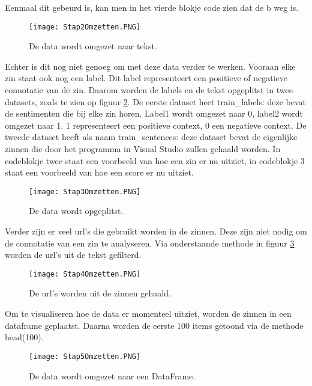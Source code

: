 Eenmaal dit gebeurd is, kan men in het vierde blokje code zien dat de b weg is.

\begin{figure}[!htbp]
    \texttt{[image: Stap2Omzetten.PNG]}
    \caption{\label{stap2amazon}De data wordt omgezet naar tekst.}
\end{figure}
\FloatBarrier

Echter is dit nog niet genoeg om met deze data verder te werken. Vooraan elke zin staat ook nog een label. Dit label representeert een positieve of negatieve connotatie van de zin. Daarom worden de labels en de tekst opgeplitst in twee datasets, zoals te zien op figuur \ref{stap3amazon}. De eerste dataset heet train\_labels: deze bevat de sentimenten die bij elke zin horen. Label1 wordt omgezet naar 0, label2 wordt omgezet naar 1. 1 representeert een positieve context, 0 een negatieve context. De tweede dataset heeft als naam train\_sentences: deze dataset bevat de eigenlijke zinnen die door het programma in Visual Studio zullen gehaald worden. In codeblokje twee staat een voorbeeld van hoe een zin er nu uitziet, in codeblokje 3 staat een voorbeeld van hoe een score er nu uitziet. 

\begin{figure}[!htbp]
    \texttt{[image: Stap3Omzetten.PNG]}
    \caption{\label{stap3amazon}De data wordt opgeplitst.}
\end{figure}
\FloatBarrier

Verder zijn er veel url's die gebruikt worden in de zinnen. Deze zijn niet nodig om de connotatie van een zin te analyseren. Via onderstaande methode in figuur \ref{stap4amazon} worden de url's uit de tekst gefilterd.

\begin{figure}[!htbp]
    \texttt{[image: Stap4Omzetten.PNG]}
    \caption{\label{stap4amazon}De url's worden uit de zinnen gehaald.}
\end{figure}
\FloatBarrier

Om te visualiseren hoe de data er momenteel uitziet, worden de zinnen in een dataframe geplaatst. Daarna worden de eerste 100 items getoond via de methode head(100).

\begin{figure}[!htbp]
    \texttt{[image: Stap5Omzetten.PNG]}
    \caption{\label{stap5amazon}De data wordt omgezet naar een DataFrame.}
\end{figure}
\FloatBarrier

